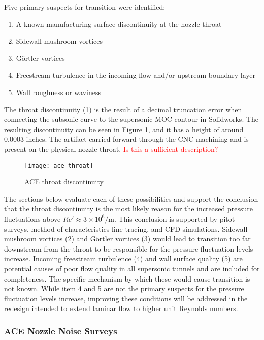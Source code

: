 Five primary suspects for transition were identified:

\begin{enumerate}
    \item A known manufacturing surface discontinuity at the nozzle throat
    \item Sidewall mushroom vortices
    \item Görtler vortices
    \item Freestream turbulence in the incoming flow and/or upstream boundary layer
    \item Wall roughness or waviness
\end{enumerate}

The throat discontinuity (1) is the result of a decimal truncation error when connecting the subsonic curve to the supersonic MOC contour in Solidworks. The resulting discontinuity can be seen in Figure \ref{fig:ace-throat}, and it has a height of around 0.0003 inches. The artifact carried forward through the CNC machining and is present on the physical nozzle throat. \textcolor{red}{Is this a sufficient description?}

\begin{figure}[ht!]
    \centering
    \texttt{[image: ace-throat]}
    \caption{ACE throat discontinuity}
    \label{fig:ace-throat}
\end{figure}


The sections below evaluate each of these possibilities and support the conclusion that the throat discontinuity is the most likely reason for the increased pressure fluctuations above $Re' \approx 3 \times 10^6/\mathrm{m}$. This conclusion is supported by pitot surveys, method-of-characteristics line tracing, and CFD simulations. Sidewall mushroom vortices (2) and Görtler vortices (3) would lead to transition too far downstream from the throat to be responsible for the pressure fluctuation levels increase. Incoming freestream turbulence (4) and wall surface quality (5) are potential causes of poor flow quality in all supersonic tunnels and are included for completeness. The specific mechanism by which these would cause transition is not known. While item 4 and 5 are not the primary suspects for the pressure fluctuation levels increase, improving these conditions will be addressed in the redesign intended to extend laminar flow to higher unit Reynolds numbers.

\subsubsection*{ACE Nozzle Noise Surveys}


